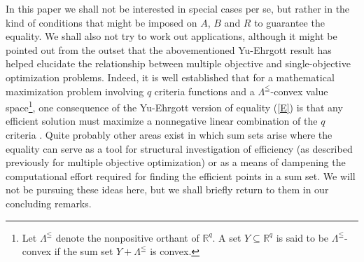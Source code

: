 \documentclass[pdflatex,sn-apa,11pt]{sn-jnl}%
\begin{document}
In this paper we shall not be interested in special cases per se, but rather in the kind of conditions that might be imposed on $A$, $B$ and $R$ to guarantee the equality. We shall also not try to work out applications, although it might be pointed out from the outset that the abovementioned Yu-Ehrgott result has helped elucidate the relationship between multiple objective and single-objective optimization problems. Indeed, it is well established that for a mathematical maximization problem involving $q$ criteria functions and a $\Lambda^{\leqq}$-convex value space\footnote{Let $\Lambda^{\leqq}$ denote the nonpositive orthant of $\mathbb{R}^{q}$. A set $Y \subseteq \mathbb{R}^{q}$ is said to be $\Lambda^{\leqq}$-convex if the sum set $Y + \Lambda^{\leqq}$ is convex.}, one consequence of the Yu-Ehrgott version of equality (\ref{E}) is that any efficient solution must maximize a nonnegative linear combination of the $q$ criteria \citep[p. 27]{yu1985multiple}. %
Quite probably other areas exist in which sum sets arise where the equality can serve as a tool for structural investigation of efficiency (as described previously for multiple objective optimization) or as a means of dampening the computational effort required for finding the efficient points in a sum set. We will not be pursuing these ideas here, but we shall briefly return to them in our concluding remarks.  %
\end{document}
